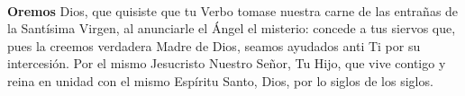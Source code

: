 \\[2mm]
\textbf{Oremos}
 Dios, que quisiste que tu Verbo tomase nuestra carne de las entrañas de la Santísima Virgen, al anunciarle el Ángel el misterio: concede a tus siervos que, pues
la creemos verdadera Madre de Dios, seamos ayudados anti Ti por su intercesión. Por el mismo Jesucristo Nuestro Señor, Tu Hijo, que vive contigo y reina en unidad con el mismo Espíritu
Santo, Dios, por lo siglos de los siglos.